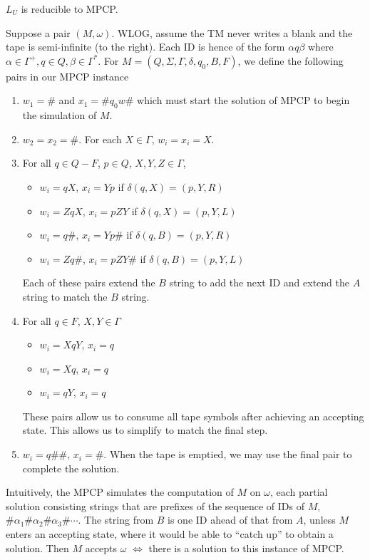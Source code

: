 \begin{prop}
  $L_U$ is reducible to MPCP.
\end{prop}
Suppose a pair $\left( M,\omega \right)$. WLOG, assume the TM never writes a
blank and the tape is semi-infinite (to the right). Each ID is hence of the
form $\alpha q\beta$ where $\alpha\in \Gamma^{+}, q\in Q, \beta\in \Gamma^{*}$.
For $M=\left( Q,\Sigma,\Gamma,\delta,q_0,B,F \right) $, we define the following
pairs in our MPCP instance
\begin{enumerate}
  \item $w_1=\#$ and $x_1=\#q_0w\#$ which must start the solution of MPCP to
    begin the simulation of $M$. 
  \item $w_2=x_2=\#$. For each $X\in \Gamma$, $w_i=x_i=X$.
  \item For all $q\in Q-F$, $p\in Q$, $X,Y,Z\in \Gamma$, 
    \begin{itemize}
      \item $w_i=qX$, $x_i=Yp$ if $\delta\left( q,X \right) =\left( p,Y,R \right) $
      \item $w_i=ZqX$, $x_i=pZY$ if $\delta\left( q,X \right) =\left( p,Y,L \right) $
      \item $w_i=q\#$, $x_i=Yp\#$ if $\delta\left( q,B \right) =\left( p,Y,R \right) $
      \item $w_i=Zq\#$, $x_i=pZY\#$ if $\delta\left( q,B \right) =\left( p,Y,L \right) $
    \end{itemize}
    Each of these pairs extend the $B$ string to add the next ID and extend the $A$ string
    to match the $B$ string.
  \item For all $q\in F$, $X,Y\in \Gamma$
    \begin{itemize}
      \item $w_i=XqY$, $x_i=q$
      \item $w_i=Xq$, $x_i=q$
      \item $w_i=qY$, $x_i=q$
    \end{itemize}
    These pairs allow us to consume all tape symbols after achieving an
    accepting state. This allows us to simplify to match the final step.
  \item $w_i=q\#\#$, $x_i=\#$. When the tape is emptied, we may use the final
    pair to complete the solution.
\end{enumerate}

Intuitively, the MPCP simulates the computation of $M$ on $\omega$, each
partial solution consisting strings that are prefixes of the sequence of IDs of
$M$, $\#\alpha_1\#\alpha_2\#\alpha_3\#\cdots$. The string from $B$ is one ID
ahead of that from $A$, unless $M$ enters an accepting state, where it would be
able to ``catch up'' to obtain a solution. Then $M$ accepts $\omega$ $\iff$
there is a solution to this instance of MPCP.\\


